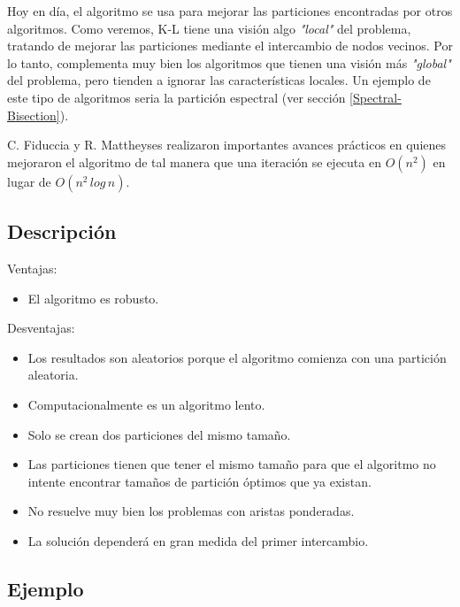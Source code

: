 
Hoy en día, el algoritmo se usa para mejorar las particiones encontradas por otros algoritmos. Como veremos, K-L tiene una visión algo \textit{"local"} del problema, tratando de mejorar las particiones mediante el intercambio de nodos vecinos. Por lo tanto, complementa muy bien los algoritmos que tienen una visión más \textit{"global"} del problema, pero tienden a ignorar las características locales. Un ejemplo de este tipo de algoritmos seria la partición espectral (ver sección \ref{Spectral-Bisection}).

C. Fiduccia y R. Mattheyses realizaron importantes avances prácticos en \cite{FiducciaMattheyses} quienes mejoraron el algoritmo de tal manera que una iteración se ejecuta en $O({n}^2)$ en lugar de $O({n}^2 \, log \, n)$.

\subsection{Descripción}

Ventajas:

\begin{itemize}
	\item El algoritmo es robusto.
\end{itemize}

Desventajas:

\begin{itemize}
	\item Los resultados son aleatorios porque el algoritmo comienza con una partición aleatoria.
	\item Computacionalmente es un algoritmo lento.
	\item Solo se crean dos particiones del mismo tamaño.
	\item Las particiones tienen que tener el mismo tamaño para que el algoritmo no intente encontrar tamaños de partición óptimos que ya existan.
	\item No resuelve muy bien los problemas con aristas ponderadas.
	\item La solución dependerá en gran medida del primer intercambio.
\end{itemize}

\subsection{Ejemplo}

